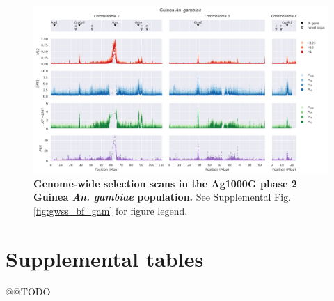 \documentclass[a4paper,11pt,abstracton,hidelinks]{scrartcl}
\begin{document}
\begin{landscape}
\begin{figure}[t!]
	\begin{center}
		\includegraphics*[width=1\linewidth,center]{artwork/gwss_gn_gam_gw_ug_gam_gq_gam.png}
	\end{center}
	\caption{
	\textbf{Genome-wide selection scans in the Ag1000G phase 2 Guinea \textit{An. gambiae} population.} 
	See Supplemental Fig. \ref{fig:gwss_bf_gam} for figure legend.
	} 
	\label{fig:gwss_gn_gam}
\end{figure}


\end{landscape}

\clearpage

\section*{Supplemental tables}

@@TODO


\clearpage


\printbibliography
\end{document}
